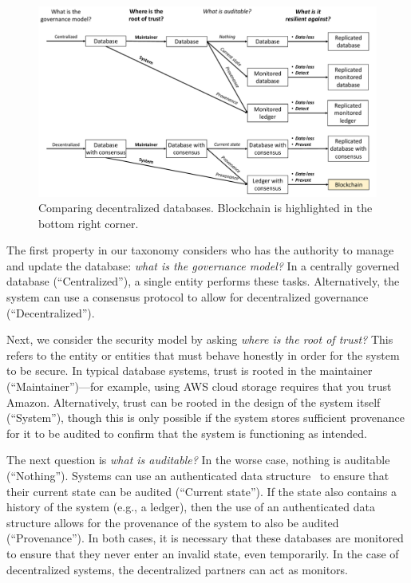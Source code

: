 \begin{figure}
	\centering
	\includegraphics[width=\textwidth]{figures/BlockchainFlowchart}
	\caption{Comparing decentralized databases. Blockchain is highlighted in the bottom right corner.}
	\label{fig:blockchainFlowchart}
\end{figure}

The first property in our taxonomy considers who has the authority to manage and update the database: \emph{what is the governance model?} In a centrally governed database (``Centralized''), a single entity performs these tasks. Alternatively, the system can use a consensus protocol to allow for decentralized governance (``Decentralized'').

Next, we consider the security model by asking \emph{where is the root of trust?}
This refers to the entity or entities that must behave honestly in order for the system to be secure.
In typical database systems, trust is rooted in the maintainer (``Maintainer'')---for example, using AWS cloud storage requires that you trust Amazon.
Alternatively, trust can be rooted in the design of the system itself (``System''), though this is only possible if the system stores sufficient provenance for it to be audited to confirm that the system is functioning as intended.

The next question is \emph{what is auditable?}
In the worse case, nothing is auditable (``Nothing'').
Systems can use an authenticated data structure~\cite{tamassia2003authenticated} to ensure that their current state can be audited (``Current state'').
If the state also contains a history of the system (e.g., a ledger), then the use of an authenticated data structure allows for the provenance of the system to also be audited (``Provenance'').
In both cases, it is necessary that these databases are monitored to ensure that they never enter an invalid state, even temporarily.
In the case of decentralized systems, the decentralized partners can act as monitors.

